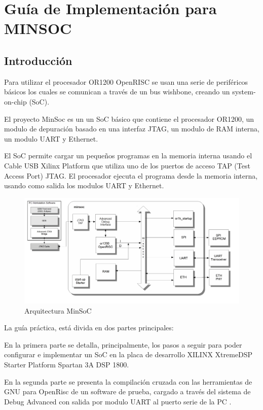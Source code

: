 
\chapter{Guía de Implementación para MINSOC}  \label{app:apendice1}
	\section{Introducción}

Para utilizar el procesador OR1200 OpenRISC se usan una serie de periféricos básicos los cuales se comunican a través de un bus wishbone, creando un system-on-chip (SoC). 

El proyecto MinSoc es un un SoC básico que  contiene el procesador OR1200, un modulo de depuración basado en una interfaz JTAG, un modulo de RAM  interna, un modulo UART y Ethernet.

El SoC permite cargar un pequeños programas en la memoria interna usando el Cable USB  Xilinx Platform que utiliza uno de los puertos de acceso TAP (Test Access Port) JTAG. El procesador ejecuta el programa desde la memoria interna, usando como salida los modulos UART y Ethernet. 

\begin{figure}[h!]
 \begin{center}
  \includegraphics[width=1\textwidth,keepaspectratio=true]{./images/minsoc}
  \caption{Arquitectura MinSoC}
  \label{fig:esquema}
 \end{center}
\end{figure}

La guía práctica, está divida en dos partes principales: 

En la primera parte se detalla, principalmente, los pasos a seguir para poder configurar e implementar un SoC en la placa de desarrollo XILINX XtremeDSP Starter Platform Spartan 3A DSP 1800.


En la segunda parte se presenta la compilación cruzada con las herramientas de GNU para OpenRisc de un software de prueba, cargado a través del sistema de Debug Advanced con salida por modulo UART al puerto serie de la PC .

